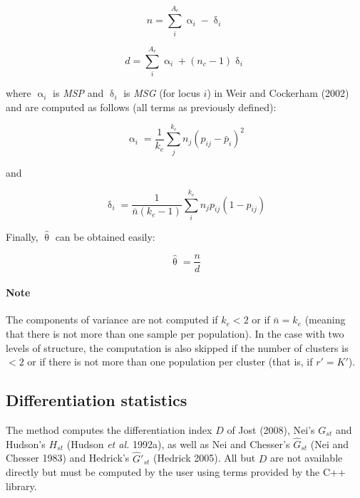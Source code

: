 \documentclass{scrartcl}
\newcommand{\cpp}[1]{{\color{blue}{\texttt{#1}}}}
\begin{document}
\begin{displaymath}
    n = \sum_i^{A_e} \upalpha_i - \updelta_i
\end{displaymath}

\begin{displaymath}
    d = \sum_i^{A_e} \upalpha_i + (n_c -1) \updelta_i
\end{displaymath}

where $\upalpha_i$ is \textit{MSP} and $\updelta_i$ is \textit{MSG} (for
locus $i$) in Weir and Cockerham (2002) and are computed as follows
(all terms as previously defined):

\begin{displaymath}
    \upalpha_i = \frac{1}{k_e} \sum_j^{k_e} n_j(p_{ij}-\bar{p}_i)^2
\end{displaymath}

and

\begin{displaymath}
    \updelta_i = \frac{1}{\bar{n}(k_e-1)} \sum_i^{k_e} n_j p_{ij}(1-p_{ij})
\end{displaymath}

Finally, $\hat{\uptheta}$
can be obtained easily:

\begin{displaymath}
    \hat{\uptheta} = \frac{n}{d}
\end{displaymath}

\paragraph{Note} The components of variance are not computed if
$k_e < 2$ or if $\bar{n} = k_e$ (meaning that there is not more than one
sample per population). In the case with two levels of structure, the
computation is also skipped if the number of clusters is $<2$ or if
there is not more than one population per cluster (that is, if $r' = K'$).


\subsection{Differentiation statistics}

The method \cpp{SiteDiversity::hstats()} computes the
differentiation index $D$ of Jost (2008), Nei's $G_{st}$ and Hudson's
$H_{st}$ (Hudson \textit{et al.} 1992a), as well as Nei and Chesser's
$\hat{G}_{st}$ (Nei and Chesser 1983) and Hedrick's $\hat{G}'_{st}$
(Hedrick 2005). All but $D$ are not available directly but must be
computed by the user using terms provided by the C++ library. \\
\end{document}
